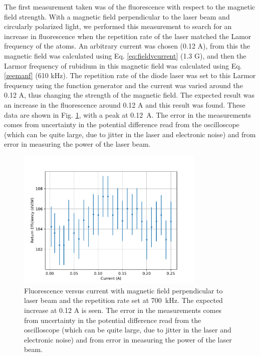 The first measurement taken was of the fluorescence with respect to the magnetic field strength. With a magnetic field perpendicular to the laser beam and circularly polarized light, we performed this measurement to search for an increase in fluorescence when the repetition rate of the laser matched the Lamor frequency of the atoms. An arbitrary current was chosen (0.12 A), from this the magnetic field was calculated using Eq. \ref{eq:fieldvcurrent} (1.3 G), and then the Larmor frequency of rubidium in this magnetic field was calculated using Eq. \ref{zeemanf} (610 kHz). The repetition rate of the diode laser was set to this Larmor frequency using the function generator and the current was varied around the 0.12 A, thus changing the strength of the magnetic field. The expected result was an increase in the fluorescence around 0.12 A and this result was found. These data are shown in Fig. \ref{fig:flvc}, with a peak at \SI{0.12}{ A}. The error in the measurements comes from uncertainty in the potential difference read from the oscilloscope (which can be quite large, due to jitter in the laser and electronic noise) and from error in measuring the power of the laser beam.


\begin{figure}[htpb]
	\centering
	\includegraphics[width=0.8\textwidth]{../../MRPData/EfficiencyCurr.pdf}
	\caption{Fluorescence versus current with magnetic field perpendicular to laser beam and the repetition rate set at \SI{700}{ kHz}. The expected increase at 0.12 A is seen. The error in the measurements comes from uncertainty in the potential difference read from the oscilloscope (which can be quite large, due to jitter in the laser and electronic noise) and from error in measuring the power of the laser beam.}
	\label{fig:flvc}
\end{figure}

